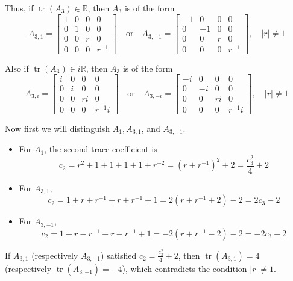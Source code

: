 \documentclass[11pt]{amsart}
\numberwithin{equation}{section}
\theoremstyle{plain}
\theoremstyle{definition}
\numberwithin{equation}{section}
\begin{document}
\begin{enumerate}
Thus, if \( \operatorname{tr}(A_3) \in \mathbb{R} \), then \( A_3 \) is of the form
\[
A_{3,1} = 
\begin{bmatrix}
1 & 0 & 0 & 0\\
0 & 1 & 0 & 0\\
0 & 0 & r & 0\\
0 & 0 & 0 & r^{-1}
\end{bmatrix}
\quad \text{or} \quad
A_{3,-1} = 
\begin{bmatrix}
-1 & 0 & 0 & 0\\
0 & -1 & 0 & 0\\
0 & 0 & r & 0\\
0 & 0 & 0 & r^{-1}
\end{bmatrix}, \quad |r| \neq 1
\]

Also if \( \operatorname{tr}(A_3) \in i\mathbb{R} \), then \( A_3 \) is of the form
\[
A_{3,i} = 
\begin{bmatrix}
i & 0 & 0 & 0\\
0 & i & 0 & 0\\
0 & 0 & ri & 0\\
0 & 0 & 0 & r^{-1}i
\end{bmatrix}
\quad \text{or} \quad
A_{3,-i} = 
\begin{bmatrix}
-i & 0 & 0 & 0\\
0 & -i & 0 & 0\\
0 & 0 & ri & 0\\
0 & 0 & 0 & r^{-1}i
\end{bmatrix}, \quad |r| \neq 1
\]

Now first we will distinguish \( A_1, A_{3,1}\), and \(A_{3,-1} \).

\begin{itemize}
    \item For \( A_1 \), the second trace coefficient is
    \[
    c_2 = r^2 + 1 + 1 + 1 + 1 + r^{-2} = (r + r^{-1})^2 + 2 = \frac{c_3^2}{4} + 2
    \]
    \item For \( A_{3,1} \),
    \[
    c_2 = 1 + r + r^{-1} + r + r^{-1} + 1 = 2(r + r^{-1} + 2) - 2 = 2c_3 - 2
    \]
    \item For \( A_{3,-1} \),
    \[
    c_2 = 1 - r - r^{-1} - r - r^{-1} + 1 = -2(r + r^{-1} - 2) - 2 = -2c_3 - 2
    \]
\end{itemize}

If \( A_{3,1} \) (respectively \( A_{3,-1} \)) satisfied \( c_2 = \frac{c_3^2}{4} + 2 \), then \( \operatorname{tr}(A_{3,1}) = 4 \) (respectively \( \operatorname{tr}(A_{3,-1}) = -4 \)), which contradicts the condition \( |r| \neq 1 \).


\end{enumerate}
\end{document}
